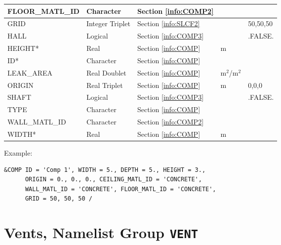 \begin{minipage}{6.5in}
\begin{longtable}{|l|l|l|l|l@{\extracolsep{\fill}}|}
{\ct FLOOR\_MATL\_ID}       & Character		 & Section \ref{info:COMP2}               &           &                 \\ \hline
{\ct GRID}             & Integer Triplet& Section \ref{info:SLCF2}               &           & 50,50,50                \\ \hline
{\ct HALL}                  & Logical  		 & Section \ref{info:COMP3}               &           & {\ct .FALSE.}   \\ \hline
{\ct HEIGHT}*                & Real     		 & Section \ref{info:COMP}   	          & m         &                 \\ \hline
{\ct ID}*                    & Character		 & Section \ref{info:COMP}                &           &          \\ \hline
{\ct LEAK\_AREA}               & Real Doublet      & Section \ref{info:COMP}                & m$^2$/m$^2$          &          \\ \hline
{\ct ORIGIN}           & Real Triplet   & Section \ref{info:COMP}                & m         & 0,0,0                \\ \hline
{\ct SHAFT}                 & Logical  		 & Section \ref{info:COMP3}                 &           & {\ct .FALSE.}   \\ \hline
{\ct TYPE}                  & Character      & Section \ref{info:COMP}                &           &          \\ \hline
{\ct WALL\_MATL\_ID}        & Character		 & Section \ref{info:COMP2}                 &           &                 \\ \hline
{\ct WIDTH}*                 & Real               & Section \ref{info:COMP}                  & m         &                 \\ \hline
\end{longtable}
\end{minipage}

\vspace{\baselineskip}
\noindent Example:
\begin{lstlisting}
&COMP ID = 'Comp 1', WIDTH = 5., DEPTH = 5., HEIGHT = 3.,
      ORIGIN = 0., 0., 0., CEILING_MATL_ID = 'CONCRETE',
      WALL_MATL_ID = 'CONCRETE', FLOOR_MATL_ID = 'CONCRETE',
      GRID = 50, 50, 50 /
\end{lstlisting}




\clearpage
\section{Vents, Namelist Group \texorpdfstring{{\tt VENT}}{VENT}}
\label{info:VENT6}

